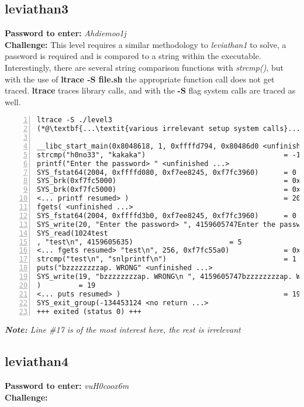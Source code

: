 \documentclass[a4paper]{article}
\newcommand{\pass}[1]{\textbf{Password to enter:} \textit{#1}\\}
\newcommand{\chall}{\textbf{Challenge:} }
\newcommand{\note}[1]{\textit{\textbf{Note:} #1}\\}
\begin{document}
\subsection*{leviathan3}
\pass{Ahdiemoo1j}
\chall This level requires a similar methodology to \textit{leviathan1} to solve, a password is required and is compared to a string within the executable.
Interestingly, there are several string comparison functions with \textit{strcmp()}, but with the use of \textbf{ltrace -S file.sh} the appropriate function call does not get traced. \textbf{ltrace} traces library calls, and with the \textbf{-S} flag system calls are traced as well.
\begin{lstlisting}[numbers=left]
ltrace -S ./level3 
(*@\textbf{...\textit{various irrelevant setup system calls}...} @*)

__libc_start_main(0x8048618, 1, 0xffffd794, 0x80486d0 <unfinished ...>
strcmp("h0no33", "kakaka")                                 = -1
printf("Enter the password> " <unfinished ...>
SYS_fstat64(2004, 0xffffd080, 0xf7ee8245, 0xf7fc3960)      = 0
SYS_brk(0xf7fc5000)                                        = 0x804b000
SYS_brk(0xf7fc5000)                                        = 0x806c000
<... printf resumed> )                                     = 20
fgets( <unfinished ...>
SYS_fstat64(2004, 0xffffd3b0, 0xf7ee8245, 0xf7fc3960)      = 0
SYS_write(20, "Enter the password> ", 4159605747Enter the password> )          = 20
SYS_read(1024test
, "test\n", 4159605635)                       = 5
<... fgets resumed> "test\n", 256, 0xf7fc55a0)             = 0xffffd5a0
strcmp("test\n", "snlprintf\n")                            = 1
puts("bzzzzzzzzap. WRONG" <unfinished ...>
SYS_write(19, "bzzzzzzzzap. WRONG\n ", 4159605747bzzzzzzzzap. WRONG
)         = 19
<... puts resumed> )                                       = 19
SYS_exit_group(-134453124 <no return ...>
+++ exited (status 0) +++
\end{lstlisting}
\note{Line \#17 is of the most interest here, the rest is irrelevant}

\subsection*{leviathan4}
\pass{vuH0coox6m}
\chall
\begin{lstlisting}
\end{lstlisting}
\end{document}
